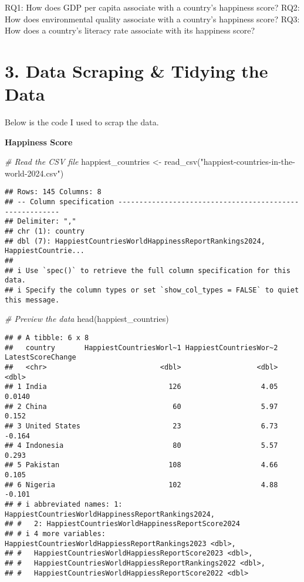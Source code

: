 \documentclass[
]{article}
\newenvironment{Shaded}{\begin{snugshade}}{\end{snugshade}}
\newcommand{\CommentTok}[1]{\textcolor[rgb]{0.56,0.35,0.01}{\textit{#1}}}
\newcommand{\FunctionTok}[1]{\textcolor[rgb]{0.00,0.00,0.00}{#1}}
\newcommand{\NormalTok}[1]{#1}
\newcommand{\OtherTok}[1]{\textcolor[rgb]{0.56,0.35,0.01}{#1}}
\newcommand{\StringTok}[1]{\textcolor[rgb]{0.31,0.60,0.02}{#1}}
\begin{document}
RQ1: How does GDP per capita associate with a country's happiness score?
RQ2: How does environmental quality associate with a country's happiness
score? RQ3: How does a country's literacy rate associate with its
happiness score?

\hypertarget{data-scraping-tidying-the-data}{%
\section{3. Data Scraping \& Tidying the
Data}\label{data-scraping-tidying-the-data}}

Below is the code I used to scrap the data.

\textbf{Happiness Score}

\begin{Shaded}
\begin{Highlighting}[]
\CommentTok{\# Read the CSV file}
\NormalTok{happiest\_countries }\OtherTok{\textless{}{-}} \FunctionTok{read\_csv}\NormalTok{(}\StringTok{"happiest{-}countries{-}in{-}the{-}world{-}2024.csv"}\NormalTok{)}
\end{Highlighting}
\end{Shaded}

\begin{verbatim}
## Rows: 145 Columns: 8
## -- Column specification --------------------------------------------------------
## Delimiter: ","
## chr (1): country
## dbl (7): HappiestCountriesWorldHappinessReportRankings2024, HappiestCountrie...
## 
## i Use `spec()` to retrieve the full column specification for this data.
## i Specify the column types or set `show_col_types = FALSE` to quiet this message.
\end{verbatim}

\begin{Shaded}
\begin{Highlighting}[]
\CommentTok{\# Preview the data}
\FunctionTok{head}\NormalTok{(happiest\_countries)}
\end{Highlighting}
\end{Shaded}

\begin{verbatim}
## # A tibble: 6 x 8
##   country       HappiestCountriesWorl~1 HappiestCountriesWor~2 LatestScoreChange
##   <chr>                           <dbl>                  <dbl>             <dbl>
## 1 India                             126                   4.05            0.0140
## 2 China                              60                   5.97            0.152 
## 3 United States                      23                   6.73           -0.164 
## 4 Indonesia                          80                   5.57            0.293 
## 5 Pakistan                          108                   4.66            0.105 
## 6 Nigeria                           102                   4.88           -0.101 
## # i abbreviated names: 1: HappiestCountriesWorldHappinessReportRankings2024,
## #   2: HappiestCountriesWorldHappinessReportScore2024
## # i 4 more variables: HappiestCountriesWorldHappiessReportRankings2023 <dbl>,
## #   HappiestCountriesWorldHappiessReportScore2023 <dbl>,
## #   HappiestCountriesWorldHappiessReportRankings2022 <dbl>,
## #   HappiestCountriesWorldHappiessReportScore2022 <dbl>
\end{verbatim}
\end{document}
